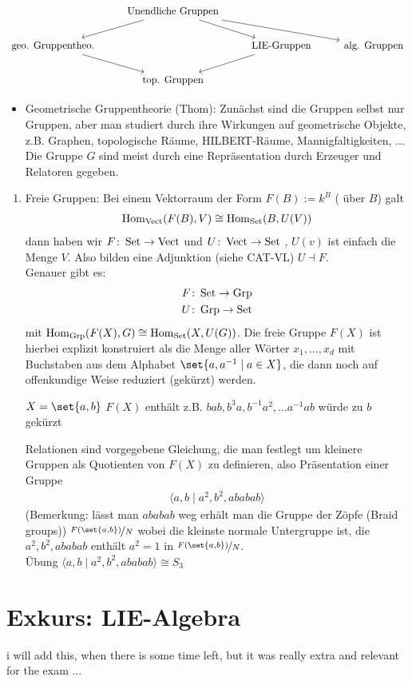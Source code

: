\[
	\begin{tikzcd}
		& \text{Unendliche Gruppen} \arrow[rrd] \arrow[rd] \arrow[ld] &                               &                     \\
		\text{geo. Gruppentheo.} \arrow[rd] &                                                             & \text{LIE-Gruppen} \arrow[ld] & \text{alg. Gruppen} \\
		& \text{top. Gruppen}                                         &                               &                    
	\end{tikzcd}
\]
\begin{itemize}
	\item Geometrische Gruppentheorie (Thom): Zunächst sind die Gruppen selbst nur Gruppen, aber man studiert durch ihre Wirkungen auf geometrische Objekte, z.B. Graphen, topologische Räume, HILBERT-Räume, Mannigfaltigkeiten, ... \\
	Die Gruppe $G$ sind meist durch eine Repräsentation durch Erzeuger und Relatoren gegeben.
\end{itemize}
\begin{enumerate}
	\item Freie Gruppen: Bei einem Vektorraum der Form $F(B):= k^B$ ( über $B$) galt
	\begin{align*}
		\operatorname{Hom}_{\operatorname{Vect}}(F(B),V) \cong \operatorname{Hom}_{\operatorname{Set}}(B,U(V))
	\end{align*}
	dann haben wir $F \colon \operatorname{Set} \to \operatorname{Vect}$  und $U \colon \operatorname{Vect} \to \operatorname{Set}$ , $U(v)$ ist einfach die Menge $V$. Also bilden eine Adjunktion (siehe CAT-VL) $U \dashv F$.\\
	Genauer gibt es:
	\begin{align*}
		F\colon \operatorname{Set} \to \operatorname{Grp}\\
		U \colon \operatorname{Grp} \to \operatorname{Set}
	\end{align*}
	mit $\operatorname{Hom}_{\operatorname{Grp}}(F(X),G) \cong \operatorname{Hom}_{\operatorname{Set}}(X,U(G))$. Die freie Gruppe $F(X)$ ist hierbei explizit konstruiert als die Menge aller Wörter $x_1, \dots, x_d$ mit Buchstaben aus dem Alphabet $\set{a,a^{-1}\mid a \in X}$, die dann noch auf offenkundige Weise reduziert (gekürzt) werden.
	\begin{*example}
		$X = \set{a,b}$ $F(X)$ enthält z.B. $bab, b^3a, b^{-1}a^2, ... a^{-1}ab$ würde zu $b$ gekürzt
	\end{*example}
	Relationen sind vorgegebene Gleichung, die man festlegt um kleinere Gruppen als Quotienten von $F(X)$ zu definieren, also Präsentation einer Gruppe
	\begin{align*}
		\langle a,b \mid a^2, b^2, ababab\rangle
	\end{align*}
	(Bemerkung: lässt man $ababab$ weg erhält man die Gruppe der Zöpfe (Braid groups))
	$\lnkset{F(\set{a,b})}{N}$ wobei die kleinste normale Untergruppe ist, die $a^2,b^2,ababab$ enthält $a^2 = 1$ in $\lnkset{F(\set{a,b})}{N}$.\\
	Übung $\langle a,b \mid a^2, b^2, ababab\rangle \cong S_3$
\end{enumerate}
\section{Exkurs: LIE-Algebra}
i will add this, when there is some time left, but it was really extra and relevant for the exam ...